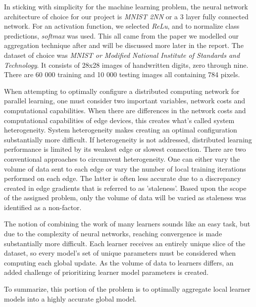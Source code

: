\documentclass[../mthe-493-final-project.tex]{subfiles}
\begin{document}
    In sticking with simplicity for the machine learning problem, the neural network architecture of choice for our project is \textit{MNIST 2NN} or a 3 layer fully connected network. For an activation function, we selected \textit{ReLu}, and to normalize class predictions, \textit{softmax} was used. This all came from the paper we modelled our aggregation technique after and will be discussed more later in the report. The dataset of choice was \textit{MNIST or Modified National Institute of Standards and Technology}. It consists of 28x28 images of handwritten digits, zero through nine. There are 60 000 training and 10 000 testing images all containing 784 pixels. 
    
    When attempting to optimally configure a distributed computing network for parallel learning, one must consider two important variables, network costs and computational capabilities. When there are differences in the network costs and computational capabilities of edge devices, this creates what’s called system heterogeneity. System heterogeneity makes creating an optimal configuration substantially more difficult. If heterogeneity is not addressed, distributed learning performance is limited by its weakest edge or slowest connection. There are two conventional approaches to circumvent heterogeneity. One can either vary the volume of data sent to each edge or vary the number of local training iterations performed on each edge. The latter is often less accurate due to a discrepancy created in edge gradients that is referred to as 'staleness'. Based upon the scope of the assigned problem, only the volume of data will be varied as staleness was identified as a non-factor.
    
    The notion of combining the work of many learners sounds like an easy task, but due to the complexity of neural networks, reaching convergence is made substantially more difficult. Each learner receives an entirely unique slice of the dataset, so every model’s set of unique parameters must be considered when computing each global update. As the volume of data to learners differs, an added challenge of prioritizing learner model parameters is created.
    
    To summarize, this portion of the problem is to optimally aggregate local learner models into a highly accurate global model.
\end{document}
